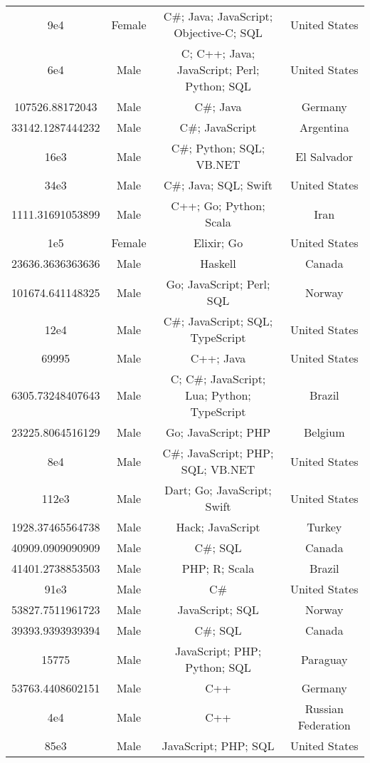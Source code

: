 \begin{center}
\begin{tabular}{ |c|c|c|c| }
9e4  &  Female  &  C\#; Java; JavaScript; Objective-C; SQL  &  United States  \\ 
6e4  &  Male  &  C; C++; Java; JavaScript; Perl; Python; SQL  &  United States  \\ 
107526.88172043  &  Male  &  C\#; Java  &  Germany  \\ 
33142.1287444232  &  Male  &  C\#; JavaScript  &  Argentina  \\ 
16e3  &  Male  &  C\#; Python; SQL; VB.NET  &  El Salvador  \\ 
34e3  &  Male  &  C\#; Java; SQL; Swift  &  United States  \\ 
1111.31691053899  &  Male  &  C++; Go; Python; Scala  &  Iran  \\ 
1e5  &  Female  &  Elixir; Go  &  United States  \\ 
23636.3636363636  &  Male  &  Haskell  &  Canada  \\ 
101674.641148325  &  Male  &  Go; JavaScript; Perl; SQL  &  Norway  \\ 
12e4  &  Male  &  C\#; JavaScript; SQL; TypeScript  &  United States  \\ 
69995  &  Male  &  C++; Java  &  United States  \\ 
6305.73248407643  &  Male  &  C; C\#; JavaScript; Lua; Python; TypeScript  &  Brazil  \\ 
23225.8064516129  &  Male  &  Go; JavaScript; PHP  &  Belgium  \\ 
8e4  &  Male  &  C\#; JavaScript; PHP; SQL; VB.NET  &  United States  \\ 
112e3  &  Male  &  Dart; Go; JavaScript; Swift  &  United States  \\ 
1928.37465564738  &  Male  &  Hack; JavaScript  &  Turkey  \\ 
40909.0909090909  &  Male  &  C\#; SQL  &  Canada  \\ 
41401.2738853503  &  Male  &  PHP; R; Scala  &  Brazil  \\ 
91e3  &  Male  &  C\#  &  United States  \\ 
53827.7511961723  &  Male  &  JavaScript; SQL  &  Norway  \\ 
39393.9393939394  &  Male  &  C\#; SQL  &  Canada  \\ 
15775  &  Male  &  JavaScript; PHP; Python; SQL  &  Paraguay  \\ 
53763.4408602151  &  Male  &  C++  &  Germany  \\ 
4e4  &  Male  &  C++  &  Russian Federation  \\ 
85e3  &  Male  &  JavaScript; PHP; SQL  &  United States  \\ 

\end{tabular}
\end{center}
